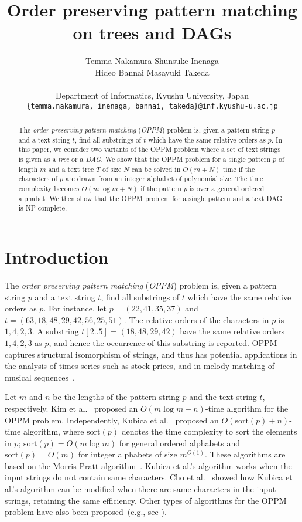 \documentclass[a4paper,11pt]{article}
\title{
 Order preserving pattern matching \\ on trees and DAGs
}
\date{}
\author{
  Temma Nakamura \quad
  Shunsuke Inenaga \quad \\
  Hideo Bannai \quad
  Masayuki Takeda \\ \\
  {Department of Informatics, Kyushu University, Japan}\\
  {\small{\texttt{\{temma.nakamura, inenaga, bannai, takeda\}@inf.kyushu-u.ac.jp}}}
}
\newcommand{\sort}{\mathrm{sort}}
\begin{document}
\maketitle


\begin{abstract}
  The \emph{order preserving pattern matching} (\emph{OPPM}) problem is,
  given a pattern string $p$ and a text string $t$,
  find all substrings of $t$ which have the same relative orders as $p$.
  In this paper, we consider two variants of the OPPM problem
  where a set of text strings is given as a \emph{tree} or a \emph{DAG}.
  We show that the OPPM problem for a single pattern $p$ of length $m$
  and a text tree $T$ of size $N$ can be solved in $O(m+N)$ time
  if the characters of $p$ are drawn from
  an integer alphabet of polynomial size.
  The time complexity becomes $O(m \log m + N)$
  if the pattern $p$ is over a general ordered alphabet.
  We then show that the OPPM problem for a single pattern
  and a text DAG is NP-complete.
\end{abstract}


\section{Introduction}

The \emph{order preserving pattern matching} (\emph{OPPM}) problem is,
given a pattern string $p$ and a text string $t$,
find all substrings of $t$ which have the same relative orders as $p$.
For instance, let $p = (22, 41, 35, 37)$ and
$t = (63, 18, 48, 29, 42, 56, 25, 51)$.
The relative orders of the characters in $p$ is $1, 4, 2, 3$.
A substring $t[2..5] = (18, 48, 29, 42)$ have the same
relative orders $1, 4, 2, 3$ as $p$,
and hence the occurrence of this substring is reported.
OPPM captures structural isomorphism of strings,
and thus has potential applications in
the analysis of times series such as stock prices, 
and in melody matching of musical sequences~\cite{KimEFHIPPT14,ChoNPS15}.

Let $m$ and $n$ be the lengths of the pattern string $p$ and the text string $t$,
respectively.
Kim et al.~\cite{KimEFHIPPT14} proposed an $O(m \log m + n)$-time
algorithm for the OPPM problem.
Independently, Kubica et al.~\cite{KubicaKRRW13} proposed
an $O(\sort(p) + n)$-time algorithm,
where $\sort(p)$ denotes the time complexity to sort the elements in $p$;
$\sort(p) = O(m \log m)$ for general ordered alphabets
and $\sort(p) = O(m)$ for integer alphabets of size $m^{O(1)}$.
These algorithms are based on the Morris-Pratt algorithm~\cite{MorrisPratt}.
Kubica et al.'s algorithm works when the input strings do not contain
same characters.
Cho et al.~\cite{ChoNPS15} showed how Kubica et al.'s algorithm can be
modified when there are same characters in the input strings,
retaining the same efficiency.
Other types of algorithms for the OPPM problem
have also been proposed~(e.g., see \cite{KimEFHIPPT14,ChoNPS15,ChhabraT16,FaroK16}).
\end{document}
